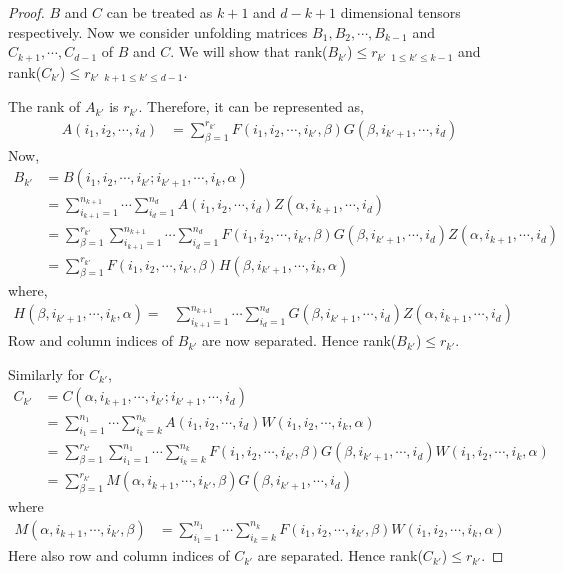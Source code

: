 \documentclass[runningheads]{llncs}
\begin{document}
\begin{proof}
	\noindent $B$ and $C$ can be treated as $k+1$ and $d-k+1$ dimensional tensors respectively. Now we consider unfolding matrices $B_1, B_2, \cdots, B_{k-1}$ and $C_{k+1},\cdots, C_{d-1}$ of $B$ and $C$. We will show that rank($B_{k'}$)$ \le r_{k'}$ $_{1\le k' \le k-1}$ and rank($C_{k'}$)$\le r_{k'}$ $_{k+1\le k' \le d-1}$.
	
	\noindent The rank of $A_{k'}$ is $r_{k'}$. Therefore, it can be represented as,
	\begin{align*}
	A(i_1, i_2, \cdots, i_d) &= \sum_{\beta=1}^{r_{k'}} F(i_1,i_2,\cdots ,i_{k'}, \beta) G(\beta, i_{k'+1},\cdots, i_d)
	\end{align*}
	Now, 
	\begin{align*}
	B_{k'} &= B(i_1,i_2, \cdots, i_{k'}; i_{k'+1},\cdots,i_k, \alpha)\\
	&= \sum_{i_{k+1}=1}^{n_{k+1}}\cdots\sum_{i_d=1}^{n_d} A(i_1, i_2, \cdots, i_d)Z(\alpha, i_{k+1},\cdots, i_d)\\
	&= \sum_{\beta=1}^{r_{k'}}  \sum_{i_{k+1}=1}^{n_{k+1}}\cdots\sum_{i_d=1}^{n_d} F(i_1,i_2,\cdots ,i_{k'}, \beta) G(\beta, i_{k'+1},\cdots, i_d) Z(\alpha, i_{k+1},\cdots, i_d)\\
	&= \sum_{\beta=1}^{r_{k'}} F(i_1,i_2,\cdots ,i_{k'}, \beta) H(\beta,i_{k'+1},\cdots, i_k, \alpha)
	\end{align*}
	\noindent where,
	\begin{align*}
	H(\beta,i_{k'+1},\cdots, i_k, \alpha) =& \sum_{i_{k+1}=1}^{n_{k+1}}\cdots\sum_{i_d=1}^{n_d} G(\beta, i_{k'+1},\cdots, i_d) Z(\alpha, i_{k+1},\cdots, i_d)
	\end{align*}
	\noindent Row and column indices of $B_{k'}$ are now separated. Hence rank($B_{k'}$)$ \le r_{k'}$.
	
	\medskip
	\noindent Similarly for $C_{k'}$,
	\begin{align*}
	C_{k'}&= C(\alpha, i_{k+1}, \cdots, i_{k'}; i_{k'+1},\cdots, i_d)\\
	&= \sum_{i_1=1}^{n_1} \cdots \sum_{i_k=k}^{n_k} A(i_1, i_2, \cdots, i_d) W(i_1,i_2,\cdots, i_k, \alpha)\\
	&= \sum_{\beta=1}^{r_{k'}} \sum_{i_1=1}^{n_1} \cdots \sum_{i_k=k}^{n_k} F(i_1,i_2,\cdots ,i_{k'}, \beta) G(\beta, i_{k'+1},\cdots, i_d) W(i_1,i_2,\cdots, i_k, \alpha)\\ 
	&= \sum_{\beta=1}^{r_{k'}} M(\alpha, i_{k+1}, \cdots, i_{k'}, \beta) G(\beta, i_{k'+1},\cdots, i_d)
	\end{align*}	
	\noindent where
	\begin{align*}
	M(\alpha, i_{k+1}, \cdots, i_{k'}, \beta) &= \sum_{i_1=1}^{n_1} \cdots \sum_{i_k=k}^{n_k} F(i_1,i_2,\cdots ,i_{k'}, \beta) W(i_1,i_2,\cdots, i_k, \alpha)
	\end{align*}
	\noindent Here also row and column indices of $C_{k'}$ are separated. Hence rank($C_{k'}$)$ \le r_{k'}$.
	

\end{proof}
\end{document}
